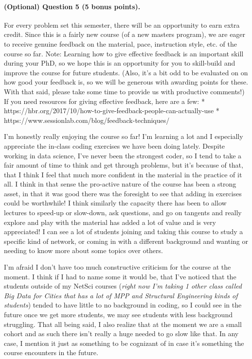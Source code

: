 \documentclass[11pt]{article}
\begin{document}
    \paragraph{(Optional) Question 5 (5 bonus
points).}\label{optional-question-5-5-bonus-points.}

For every problem set this semester, there will be an opportunity to
earn extra credit. Since this is a fairly new course (of a new masters
program), we are eager to receive genuine feedback on the material,
pace, instruction style, etc. of the course so far. Note: Learning how
to give effective feedback is an important skill during your PhD, so we
hope this is an opportunity for you to skill-build and improve the
course for future students. (Also, it's a bit odd to be evaluated on on
how good your feedback is, so we will be generous with awarding points
for these. With that said, please take some time to provide us with
productive comments!) If you need resources for giving effective
feedback, here are a few: *
https://hbr.org/2017/10/how-to-give-feedback-people-can-actually-use *
https://www.sessionlab.com/blog/feedback-techniques/

    I'm honestly really enjoying the course so far! I'm learning a lot and I
especially appreciate the in-class coding exercises we have been doing
lately. Despite working in data science, I've never been the strongest
coder, so I tend to take a fair amount of time to think and get through
problems, but it's because of that, that I think I feel that much more
confident in the material in the practice of it all. I think in that
sense the pro-active nature of the course has been a strong asset, in
that it was good there was the foresight to see that adding in exercises
could be worthwhile! I think similarly the capacity there has been to
allow lectures to speed-up or slow-down, ask questions, and go on
tangents and really explore and play with the material has added a lot
of value and is very appreciated! I can see a lot of students joining
and taking this course to study a specific kind of network, or coming in
with a different background and wanting or needing to know more about
some topics over others.

I'm afraid I don't have too much constructive criticism for the course
at the moment. I think if I had to name some it would be, that I've
noticed that the students outside of my NetSci courses (\emph{right now
I'm taking 1 other class called Big Data for Cities that has a lot of
MPP and Structural Engineering kinds of students}) tended to have little
to no background in coding, so I could see in the future once we get
more students, we may see students with less background struggling. That
all being said, I also realize that at the moment we are a small cohort
and as such there isn't really a huge needed to go slow like that. In
any case, I mention it just as something to be cognizant of in case it's
something the course encounters in the future.
\end{document}
